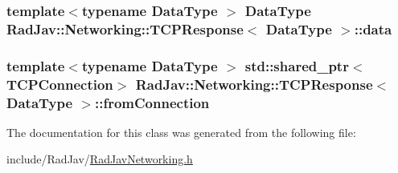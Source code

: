 \subsubsection[{\texorpdfstring{data}{data}}]{\setlength{\rightskip}{0pt plus 5cm}template$<$typename Data\+Type $>$ Data\+Type {\bf Rad\+Jav\+::\+Networking\+::\+T\+C\+P\+Response}$<$ Data\+Type $>$\+::data}\hypertarget{class_rad_jav_1_1_networking_1_1_t_c_p_response_ac1dfaf8ec7c4a8610cff43323fe75d5c}{}\label{class_rad_jav_1_1_networking_1_1_t_c_p_response_ac1dfaf8ec7c4a8610cff43323fe75d5c}
\subsubsection[{\texorpdfstring{from\+Connection}{fromConnection}}]{\setlength{\rightskip}{0pt plus 5cm}template$<$typename Data\+Type $>$ std\+::shared\+\_\+ptr$<${\bf T\+C\+P\+Connection}$>$ {\bf Rad\+Jav\+::\+Networking\+::\+T\+C\+P\+Response}$<$ Data\+Type $>$\+::from\+Connection}\hypertarget{class_rad_jav_1_1_networking_1_1_t_c_p_response_ae219168be6d6a802e6f97f8b6b99abf4}{}\label{class_rad_jav_1_1_networking_1_1_t_c_p_response_ae219168be6d6a802e6f97f8b6b99abf4}


The documentation for this class was generated from the following file\+:\begin{DoxyCompactItemize}
\item 
include/\+Rad\+Jav/\hyperlink{_rad_jav_networking_8h}{Rad\+Jav\+Networking.\+h}\end{DoxyCompactItemize}
